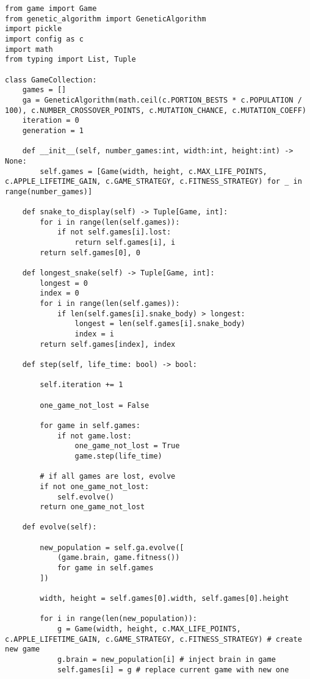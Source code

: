 \documentclass[11pt,a4paper]{article}
\begin{document}
\begin{verbatim}
from game import Game
from genetic_algorithm import GeneticAlgorithm
import pickle
import config as c
import math
from typing import List, Tuple

class GameCollection:
    games = []
    ga = GeneticAlgorithm(math.ceil(c.PORTION_BESTS * c.POPULATION / 100), c.NUMBER_CROSSOVER_POINTS, c.MUTATION_CHANCE, c.MUTATION_COEFF)
    iteration = 0
    generation = 1

    def __init__(self, number_games:int, width:int, height:int) -> None:
        self.games = [Game(width, height, c.MAX_LIFE_POINTS, c.APPLE_LIFETIME_GAIN, c.GAME_STRATEGY, c.FITNESS_STRATEGY) for _ in range(number_games)]

    def snake_to_display(self) -> Tuple[Game, int]:
        for i in range(len(self.games)):
            if not self.games[i].lost:
                return self.games[i], i
        return self.games[0], 0

    def longest_snake(self) -> Tuple[Game, int]:
        longest = 0
        index = 0
        for i in range(len(self.games)):
            if len(self.games[i].snake_body) > longest:
                longest = len(self.games[i].snake_body)
                index = i
        return self.games[index], index

    def step(self, life_time: bool) -> bool:

        self.iteration += 1

        one_game_not_lost = False

        for game in self.games:
            if not game.lost:
                one_game_not_lost = True
                game.step(life_time)

        # if all games are lost, evolve
        if not one_game_not_lost:
            self.evolve()
        return one_game_not_lost

    def evolve(self):

        new_population = self.ga.evolve([
            (game.brain, game.fitness())
            for game in self.games
        ])

        width, height = self.games[0].width, self.games[0].height

        for i in range(len(new_population)):
            g = Game(width, height, c.MAX_LIFE_POINTS, c.APPLE_LIFETIME_GAIN, c.GAME_STRATEGY, c.FITNESS_STRATEGY) # create new game
            g.brain = new_population[i] # inject brain in game
            self.games[i] = g # replace current game with new one


\end{verbatim}
\end{document}
